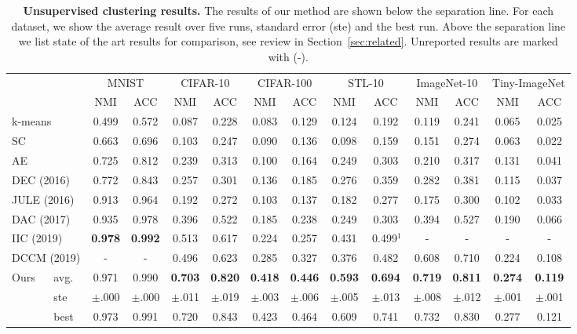 \documentclass[a4paper,conference]{IEEEtran}
\begin{document}
\begin{table*}[t]
\small
\caption{\protect\justify \textbf{Unsupervised clustering results.} The results of our method are shown below the separation line. For each dataset, we show the average result over five runs, standard error (ste) and the best run. Above the separation line we list state of the art results for comparison, see review in Section~\ref{sec:related}. Unreported results are marked with (-).}

\begin{center}
\begin{tabular}{l l c c c c c c c c c c c c}
\toprule
&  & \multicolumn{2}{c}{MNIST} & \multicolumn{2}{c}{CIFAR-10} & \multicolumn{2}{c}{CIFAR-100} & \multicolumn{2}{c}{STL-10}  & \multicolumn{2}{c}{ImageNet-10} & \multicolumn{2}{c}{Tiny-ImageNet} \\
& & NMI & ACC & NMI & ACC & NMI & ACC & NMI & ACC & NMI & ACC & NMI & ACC \\
\midrule
\multicolumn{2}{l}{k-means} & 0.499 & 0.572 & 0.087 & 0.228 & 0.083 & 0.129 & 0.124 & 0.192 & 0.119 & 0.241 & 0.065 & 0.025 \\
\multicolumn{2}{l}{SC} & 0.663 & 0.696 & 0.103 & 0.247 & 0.090 & 0.136 & 0.098 & 0.159 & 0.151 & 0.274 & 0.063 & 0.022 \\
\multicolumn{2}{l}{AE} & 0.725 & 0.812 & 0.239 & 0.313 & 0.100 & 0.164 & 0.249 & 0.303 & 0.210 & 0.317 & 0.131 & 0.041 \\
\multicolumn{2}{l}{DEC (2016)} & 0.772 & 0.843 & 0.257 & 0.301 & 0.136 & 0.185 & 0.276 & 0.359 & 0.282 & 0.381 & 0.115 & 0.037 \\
\multicolumn{2}{l}{JULE (2016)} & 0.913 & 0.964 & 0.192 & 0.272 & 0.103 & 0.137 & 0.182 & 0.277 & 0.175 & 0.300 & 0.102 & 0.033 \\
\multicolumn{2}{l}{DAC (2017)} & 0.935 & 0.978 & 0.396 & 0.522 & 0.185 & 0.238 & 0.249 & 0.303 & 0.394 & 0.527 & 0.190 & 0.066 \\
\multicolumn{2}{l}{IIC (2019)}  & \textbf{0.978} & \textbf{0.992} & 0.513 & 0.617 & 0.224 & 0.257 & 0.431 & $\ $0.499$^1$ & - & - & - & - \\
\multicolumn{2}{l}{DCCM (2019)} & - & - & 0.496 & 0.623 & 0.285 & 0.327 & 0.376 & 0.482 & 0.608 & 0.710 & 0.224 & 0.108 \\
\midrule
\multirow{3}{*}{Ours} & avg. & 0.971 & 0.990 & \textbf{0.703} & \textbf{0.820} & \textbf{0.418} & \textbf{0.446} & \textbf{0.593} & \textbf{0.694} & \textbf{0.719} & \textbf{0.811} & \textbf{0.274} & \textbf{0.119} \\
& ste & $\pm$.000 & $\pm$.000 & $\pm$.011 & $\pm$.019 & $\pm$.003 & $\pm$.006 & $\pm$.005 & $\pm$.013 & $\pm$.008 & $\pm$.012 & $\pm$.001 & $\pm$.001 \\
& best & 0.973 & 0.991 & 0.720 & 0.843 & 0.423 & 0.464 & 0.609 & 0.741 & 0.732 & 0.830 & 0.277 & 0.121 \\
\bottomrule
\end{tabular}
\end{center}
\label{table:3}
\end{table*}
\end{document}

